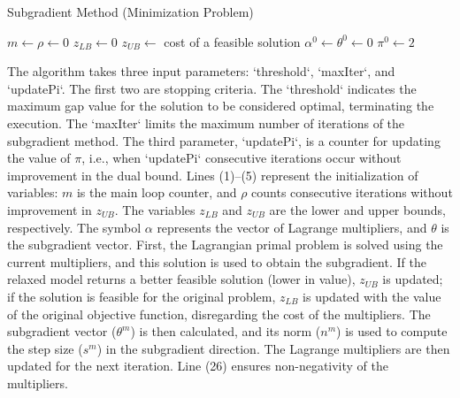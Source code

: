 \begin{algorithm}[!ht]
	\caption{\label{code:subgradient} Subgradient Method (Minimization Problem)}
	$m \leftarrow \rho \leftarrow 0$\;
	$z_{LB} \leftarrow 0$\;
	$z_{UB} \leftarrow$ cost of a feasible solution\;
	$\alpha^{0} \leftarrow \theta^{0} \leftarrow 0$\; $\pi^{0} \leftarrow 2$\;
	
\end{algorithm}

The algorithm takes three input parameters: `threshold`, `maxIter`, and
`updatePi`. The first two are stopping criteria. The `threshold` indicates the
maximum gap value for the solution to be considered optimal, terminating the
execution. The `maxIter` limits the maximum number of iterations of the
subgradient method. The third parameter, `updatePi`, is a counter for updating
the value of $\pi$, i.e., when `updatePi` consecutive iterations occur without
improvement in the dual bound. Lines (1)–(5) represent the initialization of
variables: $m$ is the main loop counter, and $\rho$ counts consecutive
iterations without improvement in $z_{UB}$. The variables $z_{LB}$ and $z_{UB}$
are the lower and upper bounds, respectively. The symbol $\alpha$ represents the
vector of Lagrange multipliers, and $\theta$ is the subgradient vector. First,
the Lagrangian primal problem is solved using the current multipliers, and this
solution is used to obtain the subgradient. If the relaxed model returns a
better feasible solution (lower in value), $z_{UB}$ is updated; if the solution
is feasible for the original problem, $z_{LB}$ is updated with the value of the
original objective function, disregarding the cost of the multipliers. The
subgradient vector ($\theta^m$) is then calculated, and its norm ($n^m$) is used
to compute the step size ($s^m$) in the subgradient direction. The Lagrange
multipliers are then updated for the next iteration. Line (26) ensures
non-negativity of the multipliers.



